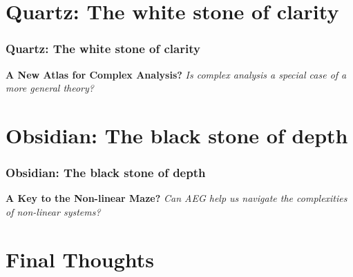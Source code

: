 \documentclass[aspectratio=169]{beamer}
\begin{document}

\section{Quartz: The white stone of clarity}

\begin{frame}
    \frametitle{Quartz: The white stone of clarity}
    \begin{center}
        \Large
        \textbf{A New Atlas for Complex Analysis?}
        \newline\newline
        \emph{Is complex analysis a special case of a more general theory?}
    \end{center}
\end{frame}



\section{Obsidian: The black stone of depth}

\begin{frame}
    \frametitle{Obsidian: The black stone of depth}
    \begin{center}
        \Large
        \textbf{A Key to the Non-linear Maze?}
        \newline\newline
        \emph{Can AEG help us navigate the complexities of non-linear systems?}
    \end{center}
\end{frame}


\section{Final Thoughts}
\end{document}
